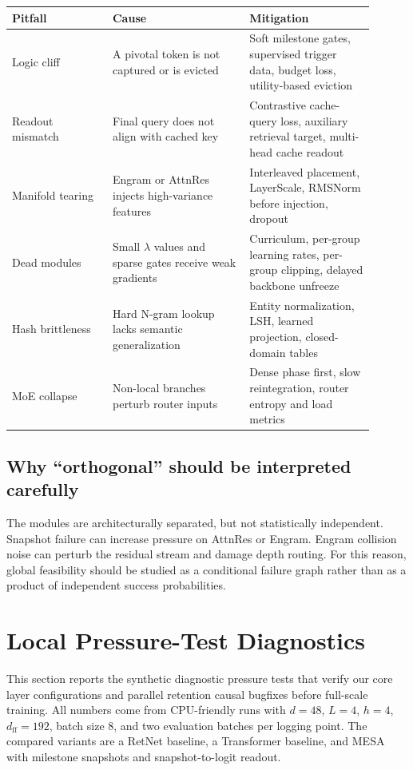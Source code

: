 \documentclass[11pt]{article}
\begin{document}
\begin{center}
\begin{tabular}{p{0.25\linewidth}p{0.34\linewidth}p{0.31\linewidth}}
\toprule
Pitfall & Cause & Mitigation \\
\midrule
Logic cliff & A pivotal token is not captured or is evicted & Soft milestone gates, supervised trigger data, budget loss, utility-based eviction \\
Readout mismatch & Final query does not align with cached key & Contrastive cache-query loss, auxiliary retrieval target, multi-head cache readout \\
Manifold tearing & Engram or AttnRes injects high-variance features & Interleaved placement, LayerScale, RMSNorm before injection, dropout \\
Dead modules & Small $\lambda$ values and sparse gates receive weak gradients & Curriculum, per-group learning rates, per-group clipping, delayed backbone unfreeze \\
Hash brittleness & Hard N-gram lookup lacks semantic generalization & Entity normalization, LSH, learned projection, closed-domain tables \\
MoE collapse & Non-local branches perturb router inputs & Dense phase first, slow reintegration, router entropy and load metrics \\
\bottomrule
\end{tabular}
\end{center}

\subsection{Why ``orthogonal'' should be interpreted carefully}

The modules are architecturally separated, but not statistically independent. Snapshot failure can increase pressure on AttnRes or Engram. Engram collision noise can perturb the residual stream and damage depth routing. For this reason, global feasibility should be studied as a conditional failure graph rather than as a product of independent success probabilities.

\section{Local Pressure-Test Diagnostics}
\label{sec:local-pressure}

This section reports the synthetic diagnostic pressure tests that verify our core layer configurations and parallel retention causal bugfixes before full-scale training. All numbers come from CPU-friendly runs with $d=48$, $L=4$, $h=4$, $d_{\mathrm{ff}}=192$, batch size $8$, and two evaluation batches per logging point. The compared variants are a RetNet baseline, a Transformer baseline, and MESA with milestone snapshots and snapshot-to-logit readout.
\end{document}
